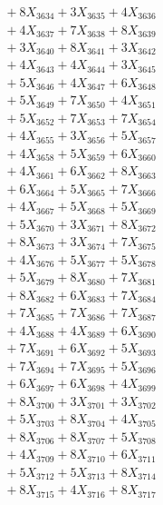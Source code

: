 \documentclass[a4paper,10pt]{article}
\begin{document}
{\begin{align}
&\;  + 8 X_{3634} + 3 X_{3635} + 4 X_{3636} \\[0.3ex]
&\;  + 4 X_{3637} + 7 X_{3638} + 8 X_{3639} \\[0.5ex]\allowbreak
&\;  + 3 X_{3640} + 8 X_{3641} + 3 X_{3642} \\[0.3ex]
&\;  + 4 X_{3643} + 4 X_{3644} + 3 X_{3645} \\[0.3ex]
&\;  + 5 X_{3646} + 4 X_{3647} + 6 X_{3648} \\[0.3ex]
&\;  + 5 X_{3649} + 7 X_{3650} + 4 X_{3651} \\[0.3ex]
&\;  + 5 X_{3652} + 7 X_{3653} + 7 X_{3654} \\[0.3ex]
&\;  + 4 X_{3655} + 3 X_{3656} + 5 X_{3657} \\[0.3ex]
&\;  + 4 X_{3658} + 5 X_{3659} + 6 X_{3660} \\[0.3ex]
&\;  + 4 X_{3661} + 6 X_{3662} + 8 X_{3663} \\[0.3ex]
&\;  + 6 X_{3664} + 5 X_{3665} + 7 X_{3666} \\[0.3ex]
&\;  + 4 X_{3667} + 5 X_{3668} + 5 X_{3669} \\[0.5ex]\allowbreak
&\;  + 5 X_{3670} + 3 X_{3671} + 8 X_{3672} \\[0.3ex]
&\;  + 8 X_{3673} + 3 X_{3674} + 7 X_{3675} \\[0.3ex]
&\;  + 4 X_{3676} + 5 X_{3677} + 5 X_{3678} \\[0.3ex]
&\;  + 5 X_{3679} + 8 X_{3680} + 7 X_{3681} \\[0.3ex]
&\;  + 8 X_{3682} + 6 X_{3683} + 7 X_{3684} \\[0.3ex]
&\;  + 7 X_{3685} + 7 X_{3686} + 7 X_{3687} \\[0.3ex]
&\;  + 4 X_{3688} + 4 X_{3689} + 6 X_{3690} \\[0.3ex]
&\;  + 7 X_{3691} + 6 X_{3692} + 5 X_{3693} \\[0.3ex]
&\;  + 7 X_{3694} + 7 X_{3695} + 5 X_{3696} \\[0.3ex]
&\;  + 6 X_{3697} + 6 X_{3698} + 4 X_{3699} \\[0.5ex]\allowbreak
&\;  + 8 X_{3700} + 3 X_{3701} + 3 X_{3702} \\[0.3ex]
&\;  + 5 X_{3703} + 8 X_{3704} + 4 X_{3705} \\[0.3ex]
&\;  + 8 X_{3706} + 8 X_{3707} + 5 X_{3708} \\[0.3ex]
&\;  + 4 X_{3709} + 8 X_{3710} + 6 X_{3711} \\[0.3ex]
&\;  + 5 X_{3712} + 5 X_{3713} + 8 X_{3714} \\[0.3ex]
&\;  + 8 X_{3715} + 4 X_{3716} + 8 X_{3717} \\[0.3ex]

\end{align}}
\end{document}
